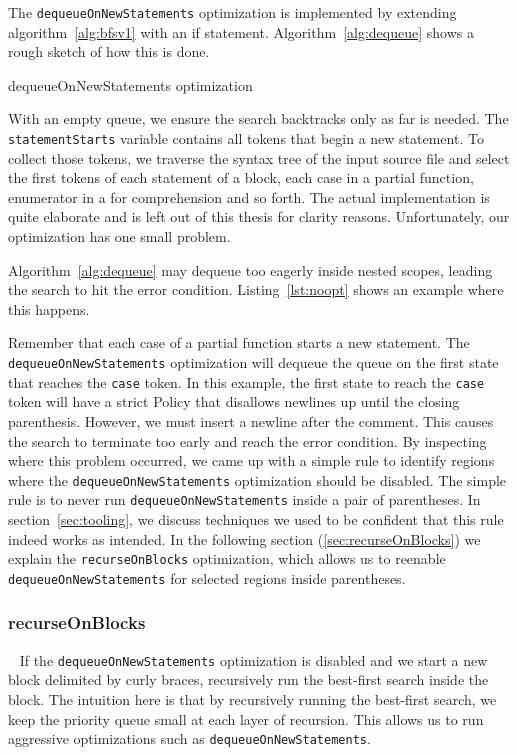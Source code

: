 The \texttt{dequeueOnNewStatements} optimization is implemented by extending algorithm~\ref{alg:bfsv1} with an if statement.
Algorithm~\ref{alg:dequeue} shows a rough sketch of how this is done.
\begin{algorithm}
\caption{dequeueOnNewStatements optimization}\label{alg:dequeue}
  
\end{algorithm}
With an empty queue, we ensure the search backtracks only as far is needed.
The \texttt{statementStarts} variable contains all tokens that begin a new statement.
To collect those tokens, we traverse the syntax tree of the input source file and select the first tokens of each statement of a block, each case in a partial function, enumerator in a for comprehension and so forth.
The actual implementation is quite elaborate and is left out of this thesis for clarity reasons.
Unfortunately, our optimization has one small problem.

Algorithm~\ref{alg:dequeue} may dequeue too eagerly inside nested scopes, leading the search to hit the error condition.
Listing~\ref{lst:noopt} shows an example where this happens.

Remember that each case of a partial function starts a new statement.
The \texttt{dequeueOnNewStatements} optimization will dequeue the queue on the first state that reaches the \texttt{case} token.
In this example, the first state to reach the \texttt{case} token will have a strict Policy that disallows newlines up until the closing parenthesis.
However, we must insert a newline after the comment.
This causes the search to terminate too early and reach the error condition.
By inspecting where this problem occurred, we came up with a simple rule to identify regions where the \texttt{dequeueOnNewStatements} optimization should be disabled.
The simple rule is to never run \texttt{dequeueOnNewStatements} inside a pair of parentheses.
In section~\ref{sec:tooling}, we discuss techniques we used to be confident that this rule indeed works as intended.
In the following section (\ref{sec:recurseOnBlocks}) we explain the \texttt{recurseOnBlocks} optimization, which allows us to reenable \texttt{dequeueOnNewStatements} for selected regions inside parentheses.

\subsubsection{recurseOnBlocks}~\label{sec:recurseOnBlocks}
If the \texttt{dequeueOnNewStatements} optimization is disabled and we start a new block delimited by curly braces, recursively run the best-first search inside the block.
The intuition here is that by recursively running the best-first search, we keep the priority queue small at each layer of recursion.
This allows us to run aggressive optimizations such as \texttt{dequeueOnNewStatements}.

